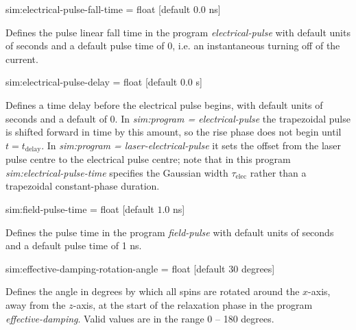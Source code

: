 {\zicf sim:electrical-pulse-fall-time = float [default $0.0$ ns]}
Defines the pulse linear fall time in the program \textit{electrical-pulse} with
 default units of seconds and a default pulse time of 0, i.e. an instantaneous
 turning off of the current.

{\zicf sim:electrical-pulse-delay = float [default $0.0$ s]}
Defines a time delay before the electrical pulse begins, with default units of seconds and a default of 0.
In \textit{sim:program = electrical-pulse} the trapezoidal pulse is shifted forward in time by this amount,
so the rise phase does not begin until $t = t_\mathrm{delay}$.
In \textit{sim:program = laser-electrical-pulse} it sets the offset from the laser pulse centre to the
electrical pulse centre; note that in this program \textit{sim:electrical-pulse-time} specifies the
Gaussian width $\tau_\mathrm{elec}$ rather than a trapezoidal constant-phase duration.

 {\zicf sim:field-pulse-time = float [default $1.0$ ns]}
 Defines the pulse time in the program \textit{field-pulse} with default
 units of seconds and a default pulse time of 1 ns.

 {\zicf sim:effective-damping-rotation-angle = float [default $30$ degrees]}
 Defines the angle in degrees by which all spins are rotated around the $x$-axis,
 away from the $z$-axis, at the start of the relaxation phase in the program
 \textit{effective-damping}. Valid values are in the range 0 -- 180 degrees.

